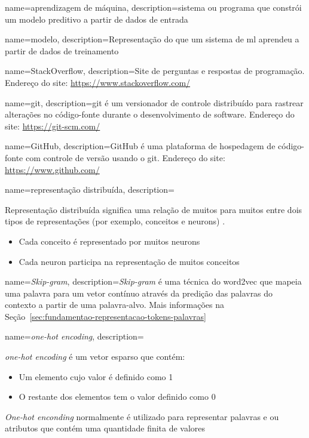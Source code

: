 {
    name=aprendizagem de máquina,
    description={sistema ou programa que constrói um modelo preditivo a partir de dados de entrada \citep{glossary-ml}}
}

{
    name=modelo,
    description={Representação do que um sistema de \gls{ml} aprendeu a partir de dados de treinamento \citep{glossary-ml}}
}

{
    name=StackOverflow,
    description={Site de perguntas e respostas de programação. Endereço do site: \url{https://www.stackoverflow.com/}}
}

{
    name=git,
    description={git é um versionador de controle distribuído para rastrear alterações no código-fonte durante o desenvolvimento de software. Endereço do site: \url{https://git-scm.com/} \citep{wikipedia-git-2019}}
}

{
    name=GitHub,
    description={GitHub é uma plataforma de hospedagem de código-fonte com controle de versão usando o \gls{git}. Endereço do site: \url{https://www.github.com/}}
}

{
    name=representação distribuída,
    description={Representação distribuída significa uma relação de muitos para muitos entre dois tipos de representações (por exemplo, conceitos e \gls{neuron}s) \citep{Hinton-distributed-representatons:1986}. 
    \begin{itemize}
        \item Cada conceito é representado por muitos \gls{neuron}s
        \item Cada \gls{neuron} participa na representação de muitos conceitos
    \end{itemize}
    }
}

{
    name=\textit{Skip-gram},
    description={\textit{Skip-gram} é uma técnica do \gls{word2vec} que mapeia uma palavra para um vetor contínuo através da predição das palavras do contexto a partir de uma palavra-alvo. Mais informações na Seção~\ref{sec:fundamentao-representacao-tokens-palavras}
    }
}

{
    name=\textit{one-hot encoding},
    description={\textit{one-hot encoding} é um vetor esparso que contém:
    \begin{itemize}
        \item Um elemento cujo valor é definido como 1
        \item O restante dos elementos tem o valor definido como 0
    \end{itemize}
    \textit{One-hot enconding} normalmente é utilizado para representar palavras e ou atributos que contém uma quantidade finita de valores \citep{glossary-ml}
    }
}

